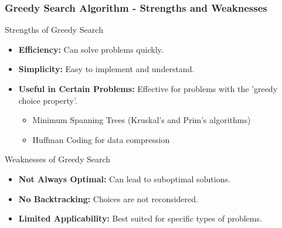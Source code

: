 \documentclass[aspectratio=169]{beamer}
\begin{document}
\begin{frame}[fragile]
    \frametitle{Greedy Search Algorithm - Strengths and Weaknesses}
    \begin{block}{Strengths of Greedy Search}
        \begin{itemize}
            \item \textbf{Efficiency:} Can solve problems quickly.
            \item \textbf{Simplicity:} Easy to implement and understand.
            \item \textbf{Useful in Certain Problems:} Effective for problems with the 'greedy choice property'.
                \begin{itemize}
                    \item Minimum Spanning Trees (Kruskal’s and Prim’s algorithms)
                    \item Huffman Coding for data compression
                \end{itemize}
        \end{itemize}
    \end{block}

    \begin{block}{Weaknesses of Greedy Search}
        \begin{itemize}
            \item \textbf{Not Always Optimal:} Can lead to suboptimal solutions.
            \item \textbf{No Backtracking:} Choices are not reconsidered.
            \item \textbf{Limited Applicability:} Best suited for specific types of problems.
        \end{itemize}
    \end{block}
\end{frame}
\end{document}
